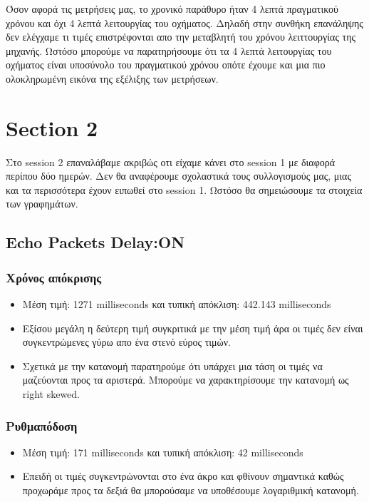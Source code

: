 \documentclass[hidelinks, 12pt, a4paper]{article}
\begin{document}
Όσον αφορά τις μετρήσεις μας, το χρονικό παράθυρο ήταν 4 λεπτά πραγματικού χρόνου και όχι 4 λεπτά λειτουργίας του οχήματος. Δηλαδή στην συνθήκη επανάληψης δεν ελέγχαμε τι τιμές επιστρέφονται απο την μεταβλητή του χρόνου λειττουργίας της μηχανής. Ωστόσο μπορούμε να παρατηρήσουμε ότι τα 4 λεπτά λειτουργίας του οχήματος είναι υποσύνολο του πραγματικού χρόνου οπότε έχουμε και μια πιο ολοκληρωμένη εικόνα της εξέλιξης των μετρήσεων. 

\section{Section 2}

Στο session 2 επαναλάβαμε ακριβώς οτι είχαμε κάνει στο session 1 με διαφορά περίπου δύο ημερών. Δεν θα αναφέρουμε σχολαστικά τους συλλογισμούς μας, μιας και τα περισσότερα έχουν ειπωθεί στο session 1. Ωστόσο θα σημειώσουμε τα στοιχεία των γραφημάτων.

\subsection{Echo Packets Delay:ON}
\subsubsection{Χρόνος απόκρισης}
\begin{itemize}
    \item Μέση τιμή: 1271 milliseconds και τυπική απόκλιση: 442.143 milliseconds 
    \item Εξίσου μεγάλη η δεύτερη τιμή συγκριτικά με την μέση τιμή άρα οι τιμές δεν είναι συγκεντρώμενες γύρω απο ένα στενό εύρος τιμών.
    \item Σχετικά με την κατανομή παρατηρούμε ότι υπάρχει μια τάση οι τιμές να μαζεύονται προς τα αριστερά. Μπορούμε να χαρακτηρίσουμε την κατανομή ως right skewed.
\end{itemize}

\subsubsection{Ρυθμαπόδοση}

\begin{itemize}
    \item Μέση τιμή: 171 milliseconds και τυπική απόκλιση: 42 milliseconds
    \item Επειδή οι τιμές συγκεντρώνονται στο ένα άκρο και φθίνουν σημαντικά καθώς προχωράμε προς τα δεξιά θα μπορούσαμε να υποθέσουμε λογαριθμική κατανομή.
\end{itemize}
\end{document}
